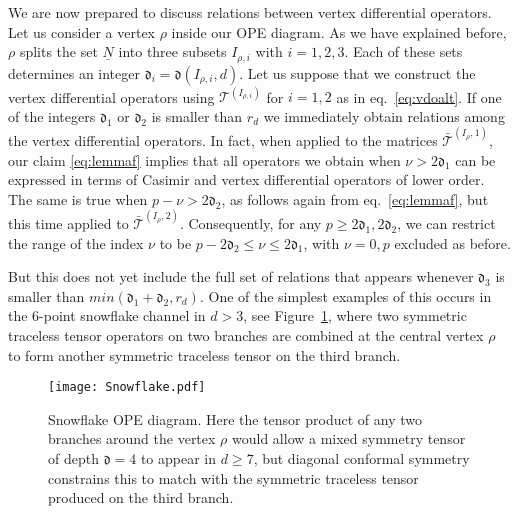 \documentclass{article}
\def\dep{\mathfrak{d}}
\begin{document}
We are now prepared to discuss relations between vertex differential operators. 
Let us consider a vertex $\rho$ inside our OPE diagram. As we have explained before, 
$\rho$ splits the set $\underline{N}$ into three subsets $I_{\rho,i}$ with $i=1,2,3$. 
Each of these sets determines an integer $\dep_i = \dep(I_{\rho,i},d)$. Let us 
suppose that we construct the vertex differential operators using $\mathcal{T}
^{(I_{\rho,i})}$ for $i=1,2$ as in eq.\ \eqref{eq:vdoalt}. 
If one of the integers $\dep_1$ or $\dep_2$ is smaller than $r_d$ we immediately obtain 
relations among the vertex differential operators. In fact, when applied to the matrices $\bar{\mathcal{T}}^{(I_\rho,1)}$, our claim 
\eqref{eq:lemmaf} implies that all operators we obtain when $\nu > 2 \dep_1$ can be expressed in terms of Casimir and 
vertex differential operators of lower order. The same is true when $p-\nu > 2\dep_2$, 
as follows again from eq.\ \eqref{eq:lemmaf}, but this time applied to 
$\bar {\mathcal{T}}^{(I_\rho,2)}$. Consequently, for any $p \geq 2\dep_1,2\dep_2$, we 
can restrict the range of the index $\nu$ to be $p-2\dep_2 \leq \nu \leq 2\dep_1$, 
with $\nu = 0,p$ excluded as before.  
 
But this does not yet include the full set of relations that appears whenever $\dep_3$ 
is smaller than $\textit{min}(\dep_1+\dep_2,r_d)$. One of the simplest examples of this 
occurs in the 6-point snowflake channel in $d>3$, see Figure~\ref{fig:Snowflake}, 
where two symmetric traceless tensor operators on two branches are combined at the central 
vertex $\rho$ to form another symmetric traceless tensor on the third branch.

\begin{figure}[thb]
\centering
\texttt{[image: Snowflake.pdf]}
\caption{Snowflake OPE diagram. Here the tensor product of any two branches around 
the vertex $\rho$ would allow a mixed symmetry tensor of depth $\dep = 4$ to appear in $d
\ge7$, but diagonal conformal symmetry constrains this to match with the symmetric 
traceless tensor produced on the third branch.}
\label{fig:Snowflake}
\end{figure}
\end{document}
